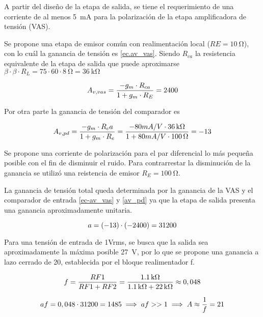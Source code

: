 A partir del diseño de la etapa de salida, se tiene el requerimiento de una corriente de al menos \SI{5}{\milli\ampere} para la polarización de la etapa amplificadora de tensión (VAS).

Se propone una etapa de emisor común con realimentación local ($RE = \SI{10}{\ohm}$), con lo cuál la ganancia de tensión es \eqref{ec.av_vas}. Siendo $R_{ca}$ la resistencia equivalente de la etapa de salida que puede aproximarse $\beta \cdot \beta \cdot R_L = 75 \cdot 60 \cdot \SI{8}{\ohm} = \SI{36}{\kilo\ohm}$

\begin{equation}
	\centering
	A_{v,vas} = \frac{-g_m \cdot R_{ca}}{1+g_m \cdot R_E} = 2400
	\label{ec.av_vas}
\end{equation}
	

Por otra parte la ganancia de tensión del comparador es

\begin{equation}
	\centering
	A_{v,pd} = \frac{-g_m \cdot R_ca}{1+g_m \cdot R_e} = \frac{-80mA/V \cdot \SI{36}{\kilo\ohm} }{ 1 + 80mA/V \cdot \SI{100}{\ohm} } = -13
	\label{ec.av_pd}
\end{equation}

Se propone una corriente de polarización para el par diferencial lo más pequeña posible con el fin de disminuir el ruido. Para contrarrestar la disminución de la ganancia se utilizó una reistencia de emisor $R_E=\SI{100}{\ohm}$.


La ganancia de tensión total queda determinada por la ganancia de la VAS y el comparador de entrada \eqref{ec-av_vas} y \eqref{av_pd} ya que la etapa de salida presenta una ganancia aproximadamente unitaria.

\begin{equation}
	\centering
	a = (-13) \cdot (-2400) = 31200
	\label{ec.a}
\end{equation}

Para una tensión de entrada de 1Vrms, se busca que la salida sea aproximadamente la máxima posible \SI{27}{\volt}, por lo que se propone una ganancia a lazo cerrado de 20, establecida por el bloque realimentador f.

\begin{equation}
	\centering
	f = \frac{RF1}{RF1 + RF2} = \frac{\SI{1.1}{\kilo\ohm}}{\SI{1.1}{\kilo\ohm} + \SI{22}{\kilo\ohm}} \approx 0,048
\end{equation}

\begin{equation}
	\centering
	af = 0,048 \cdot 31200 = 1485 \implies af >> 1 \implies A \approx \frac{1}{f} = 21
\end{equation}

